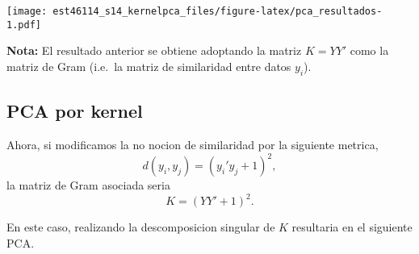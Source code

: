\documentclass[11pt,]{article}
\newenvironment{Shaded}{\begin{snugshade}}{\end{snugshade}}
\newcommand{\KeywordTok}[1]{\textcolor[rgb]{0.13,0.29,0.53}{\textbf{#1}}}
\newcommand{\DataTypeTok}[1]{\textcolor[rgb]{0.13,0.29,0.53}{#1}}
\newcommand{\DecValTok}[1]{\textcolor[rgb]{0.00,0.00,0.81}{#1}}
\newcommand{\FloatTok}[1]{\textcolor[rgb]{0.00,0.00,0.81}{#1}}
\newcommand{\StringTok}[1]{\textcolor[rgb]{0.31,0.60,0.02}{#1}}
\newcommand{\OperatorTok}[1]{\textcolor[rgb]{0.81,0.36,0.00}{\textbf{#1}}}
\newcommand{\NormalTok}[1]{#1}
\begin{document}
\begin{Shaded}
\end{Shaded}

\texttt{[image: est46114\_s14\_kernelpca\_files/figure-latex/pca\_resultados-1.pdf]}

\textbf{Nota:} El resultado anterior se obtiene adoptando la matriz
\(K=YY'\) como la matriz de Gram (i.e.~la matriz de similaridad entre
datos \(y_i\)).

\subsection{PCA por kernel}\label{pca-por-kernel}

Ahora, si modificamos la no nocion de similaridad por la siguiente
metrica, \[
d(y_i,y_j)=\left(y_i'y_j+1\right)^{2},
\] la matriz de Gram asociada seria \[
K=\left(YY'+1\right)^{2}.
\]

En este caso, realizando la descomposicion singular de \(K\) resultaria
en el siguiente PCA.
\end{document}
